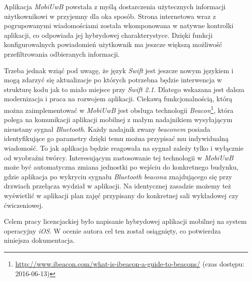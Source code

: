 \documentclass{iiuwb}
\begin{document}
Aplikacja \textit{MobiUwB} powstała z myślą dostarczenia użytecznych informacji użytkownikowi w przyjemny dla oka sposób. Strona internetowa wraz z pogrupowanymi wiadomościami została wkomponowana w natywne kontrolki aplikacji, co odpowiada jej hybrydowej charakterystyce. Dzięki funkcji konfigurowalnych powiadomień użytkownik ma jeszcze większą możliwość przefiltrowania odbieranych informacji.

Trzeba jednak wziąć pod uwagę, że język \textit{Swift} jest jeszcze nowym językiem i mogą zdarzyć się aktualizacje po których potrzebna będzie interwencja w strukturę kodu jak to miało miejsce przy \textit{Swift 2.1}. Dlatego wskazana jest dalsza modernizacja i praca na rozwojem aplikacji. Ciekawą funkcjonalnością, którą można zaimplementować w \textit{MobiUwB} jest obsługa technologii \textit{Beacon}\footnote{\url{http://www.ibeacon.com/what-is-ibeacon-a-guide-to-beacons/} (czas dostępu: 2016-06-13)}, która polega na komunikacji aplikacji mobilnej z małym nadajnikiem wysyłającym nieustany sygnał \textit{Bluetooth}. Każdy nadajnik zwany \textit{beaconem} posiada identyfikujące go parametry dzięki temu można przypisać mu indywidualną wiadomość. To jak aplikacja będzie reagowała na sygnał zależy tylko i wyłącznie od wyobraźni twórcy. Interesującym zastosowanie tej technologii w \textit{MobiUwB} może być automatyczna zmiana jednostki po wejściu do konkretnego budynku, gdzie aplikacja po wykryciu sygnału \textit{Bluetooth }\textit{beacona} znajdującego się przy drzwiach przełącza wydział w aplikacji. Na identycznej zasadzie możemy też wyświetlić w aplikacji plan zajęć przypisany do konkretnej sali wykładowej czy ćwiczeniowej.

Celem pracy licencjackiej było napisanie hybrydowej aplikacji mobilnej na system operacyjny \textit{iOS}. W ocenie autora cel ten został osiągnięty, co potwierdza niniejsza dokumentacja.
\cleardoublepage


\end{document}
